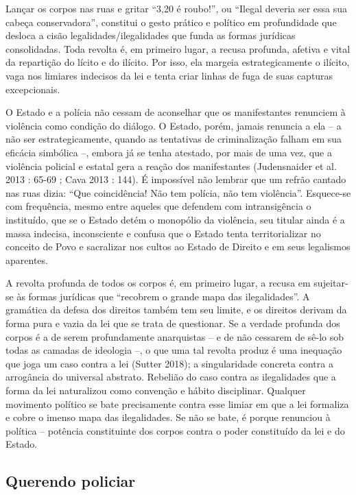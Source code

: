 Lançar os corpos nas ruas e gritar ``3,20 é roubo!'', ou ``Ilegal
deveria ser essa sua cabeça conservadora'', constitui o gesto prático e
político em profundidade que desloca a cisão legalidades/ilegalidades
que funda as formas jurídicas consolidadas. Toda revolta é, em primeiro
lugar, a recusa profunda, afetiva e vital da repartição do lícito e do
ilícito. Por isso, ela margeia estrategicamente o ilícito, vaga nos
limiares indecisos da lei e tenta criar linhas de fuga de suas capturas
excepcionais.

O Estado e a polícia não cessam de aconselhar que os manifestantes
renunciem à violência como condição do diálogo. O Estado, porém, jamais
renuncia a ela -- a não ser estrategicamente, quando as tentativas de
criminalização falham em sua eficácia simbólica --, embora já se tenha
atestado, por mais de uma vez, que a violência policial e estatal gera a
reação dos manifestantes (Judensnaider et al. 2013 : 65-69 ; Cava 2013 :
144). É impossível não lembrar que um refrão cantado nas ruas dizia:
``Que coincidência! Não tem polícia, não tem violência''. Esquece-se com
frequência, mesmo entre aqueles que defendem com intransigência o
instituído, que se o Estado detém o monopólio da violência, seu titular
ainda é a massa indecisa, inconsciente e confusa que o Estado tenta
territorializar no conceito de Povo e sacralizar nos cultos ao Estado de
Direito e em seus legalismos aparentes.

A revolta profunda de todos os corpos é, em primeiro lugar, a recusa em
sujeitar-se às formas jurídicas que ``recobrem o grande mapa das
ilegalidades''. A gramática da defesa dos direitos também tem seu
limite, e os direitos derivam da forma pura e vazia da lei que se trata
de questionar. Se a verdade profunda dos corpos é a de serem
profundamente anarquistas -- e de não cessarem de sê-lo sob todas as
camadas de ideologia --, o que uma tal revolta produz é uma inequação
que joga um caso contra a lei (Sutter 2018); a singularidade concreta
contra a arrogância do universal abstrato. Rebelião do caso contra as
ilegalidades que a forma da lei naturalizou como convenção e hábito
disciplinar. Qualquer movimento político se bate precisamente contra
esse limiar em que a lei formaliza e cobre o imenso mapa das
ilegalidades. Se não se bate, é porque renunciou à política -- potência
constituinte dos corpos contra o poder constituído da lei e do Estado.

\subsection{Querendo policiar}

